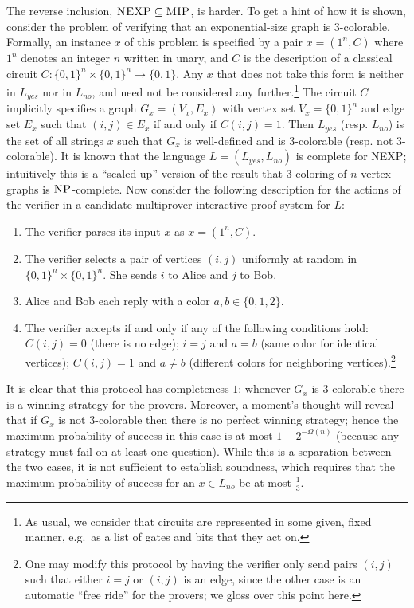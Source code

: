 The reverse inclusion, $\textsc{NEXP}\subseteq \textsc{MIP}$, is harder. To get a hint of how it is shown, consider the problem of verifying that an exponential-size graph is $3$-colorable. Formally, an instance $x$ of this problem is specified by a pair $x=(1^n,C)$ where $1^n$ denotes an integer $n$ written in unary, and $C$ is the description of a classical circuit $C:\{0,1\}^n \times \{0,1\}^n \to \{0,1\}$. Any $x$ that does not take this form is neither in $L_{yes}$ nor in $L_{no}$, and need not be considered any further.\footnote{As usual, we consider that circuits are represented in some given, fixed manner, e.g.\ as a list of gates and bits that they act on.}  The circuit $C$ implicitly specifies a graph $G_x = (V_x,E_x)$ with vertex set $V_x = \{0,1\}^n$ and edge set $E_x$ such that $(i,j)\in E_x$ if and only if $C(i,j)=1$. Then $L_{yes}$ (resp. $L_{no}$) is the set of all strings $x$ such that $G_x$ is well-defined and is $3$-colorable (resp. not $3$-colorable). It is known that the language $L=(L_{yes},L_{no})$ is complete for NEXP; intuitively this is a ``scaled-up'' version of the result that $3$-coloring of $n$-vertex graphs is $\textsc{NP}$-complete. Now consider the following description for the actions of the verifier in a candidate multiprover interactive proof system for $L$: 
\begin{enumerate}
\item The verifier parses its input $x$ as $x=(1^n,C)$. 
\item The verifier selects a pair of vertices $(i,j)$ uniformly at random in $\{0,1\}^n\times \{0,1\}^n$. She sends $i$ to Alice and $j$ to Bob.
\item Alice and Bob each reply with a color $a,b\in \{0,1,2\}$. 
\item The verifier accepts if and only if any of the following conditions hold: $C(i,j)=0$ (there is no edge); $i=j$ and $a=b$ (same color for identical vertices); $C(i,j)=1$ and $a\neq b$ (different colors for neighboring vertices).\footnote{One may modify this protocol by having the verifier only send pairs $(i,j)$ such that either $i=j$ or $(i,j)$ is an edge, since the other case is an automatic ``free ride'' for the provers; we gloss over this point here.}
\end{enumerate}
It is clear that this protocol has completeness $1$: whenever $G_x$ is $3$-colorable there is a winning strategy for the provers. Moreover, a moment's thought will reveal that if $G_x$ is not $3$-colorable then there is no perfect winning strategy; hence the maximum probability of success in this case is at most $1-2^{-\Omega(n)}$ (because any strategy must fail on at least one question). While this is a separation between the two cases, it is not sufficient to establish soundness, which requires that the maximum probability of success for an $x\in L_{no}$ be at most $\frac{1}{3}$. 

